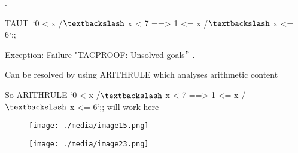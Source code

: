 \documentclass[12pt]{article}
\renewcommand{\_}{\kern-1.5pt\textunderscore\kern-1.5pt}
\begin{document}
{\fontsize{14pt}{16.8pt}. {\fontsize{13pt}{15.6pt}\selectfont TAUT\  `0 < x /$\textbackslash$  x < 7 ==> 1 <= x /$\textbackslash$  x <= 6`;;\par}\par}\par

{\fontsize{14pt}{16.8pt}\selectfont Exception: Failure "TAC\_PROOF: Unsolved goals$"$ .\par}\par

{\fontsize{14pt}{16.8pt}\selectfont Can be resolved by using ARITH\_RULE which analyses arithmetic content\par}\par

{\fontsize{13pt}{15.6pt}\selectfont So ARITH\_RULE `0 < x /$\textbackslash$  x < 7 ==> 1 <= x /$\textbackslash$  x <= 6`;; will work here\par}\par

{\fontsize{9pt}{10.8pt}\selectfont  \par}\par


\vspace{\baselineskip}

\vspace{\baselineskip}

\vspace{\baselineskip}



\begin{figure}[H]
	\begin{FlushLeft}		\texttt{[image: ./media/image15.png]}
	\end{FlushLeft}\end{figure}



\par


\vspace{\baselineskip}

\vspace{\baselineskip}



\begin{figure}[H]
	\begin{FlushLeft}		\texttt{[image: ./media/image23.png]}
	\end{FlushLeft}\end{figure}
\end{document}
